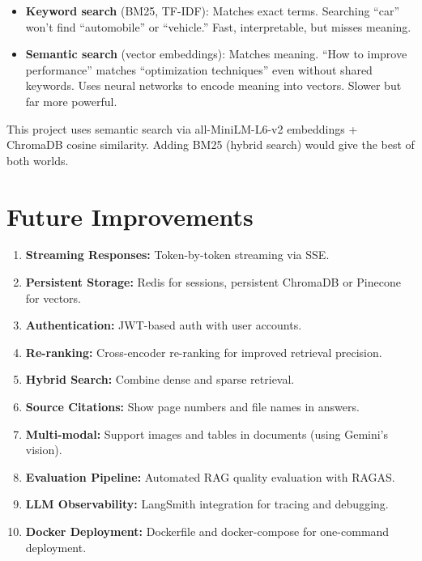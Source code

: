 \documentclass[12pt,a4paper]{article}
\begin{document}
\begin{interviewbox}
\end{interviewbox}
\begin{answerbox}
\begin{itemize}
  \item \textbf{Keyword search} (BM25, TF-IDF): Matches exact terms. Searching ``car'' won't find ``automobile'' or ``vehicle.'' Fast, interpretable, but misses meaning.
  \item \textbf{Semantic search} (vector embeddings): Matches meaning. ``How to improve performance'' matches ``optimization techniques'' even without shared keywords. Uses neural networks to encode meaning into vectors. Slower but far more powerful.
\end{itemize}
This project uses semantic search via all-MiniLM-L6-v2 embeddings + ChromaDB cosine similarity. Adding BM25 (hybrid search) would give the best of both worlds.
\end{answerbox}

\section{Future Improvements}

\begin{enumerate}
  \item \textbf{Streaming Responses:} Token-by-token streaming via SSE.
  \item \textbf{Persistent Storage:} Redis for sessions, persistent ChromaDB or Pinecone for vectors.
  \item \textbf{Authentication:} JWT-based auth with user accounts.
  \item \textbf{Re-ranking:} Cross-encoder re-ranking for improved retrieval precision.
  \item \textbf{Hybrid Search:} Combine dense and sparse retrieval.
  \item \textbf{Source Citations:} Show page numbers and file names in answers.
  \item \textbf{Multi-modal:} Support images and tables in documents (using Gemini's vision).
  \item \textbf{Evaluation Pipeline:} Automated RAG quality evaluation with RAGAS.
  \item \textbf{LLM Observability:} LangSmith integration for tracing and debugging.
  \item \textbf{Docker Deployment:} Dockerfile and docker-compose for one-command deployment.
\end{enumerate}
\end{document}

